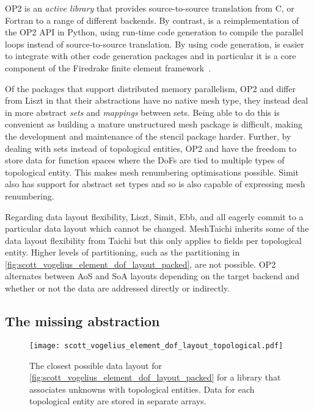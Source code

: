 \documentclass[thesis]{subfiles}
\begin{document}
OP2 is an \emph{active library} that provides source-to-source translation from C, \cplusplus or Fortran to a range of different backends.
By contrast,  is a reimplementation of the OP2 API in Python, using run-time code generation to compile the parallel loops instead of source-to-source translation.
By using code generation,  is easier to integrate with other code generation packages and in particular it is a core component of the Firedrake finite element framework~\cite{FiredrakeUserManual}.

Of the packages that support distributed memory parallelism, OP2 and  differ from Liszt in that their abstractions have no native mesh type, they instead deal in more abstract \emph{sets} and \emph{mappings} between sets.
Being able to do this is convenient as building a mature unstructured mesh package is difficult, making the development and maintenance of the stencil package harder.
Further, by dealing with sets instead of topological entities, OP2 and  have the freedom to store data for function spaces where the DoFs are tied to multiple types of topological entity.
This makes mesh renumbering optimisations possible.
Simit also has support for abstract set types and so is also capable of expressing mesh renumbering.

Regarding data layout flexibility, Liszt, Simit, Ebb, and  all eagerly commit to a particular data layout which cannot be changed.
MeshTaichi inherits some of the data layout flexibility from Taichi but this only applies to fields per topological entity. Higher levels of partitioning, such as the  partitioning in \cref{fig:scott_vogelius_element_dof_layout_packed}, are not possible.
OP2 alternates between AoS and SoA layouts depending on the target backend and whether or not the data are addressed directly or indirectly.

\subsection{The missing abstraction}
\label{sec:intro_missing_abstraction}

\begin{figure}
  \centering
  \texttt{[image: scott\_vogelius\_element\_dof\_layout\_topological.pdf]}
  \caption{
    The closest possible data layout for \cref{fig:scott_vogelius_element_dof_layout_packed} for a library that associates unknowns with topological entities.
    Data for each topological entity are stored in separate arrays.
  }
  \label{fig:scott_vogelius_element_dof_layout_topological}
\end{figure}
\end{document}
